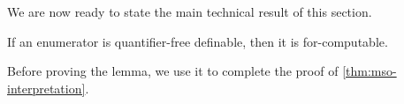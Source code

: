 



 
We are now ready to state  the main technical result of this section.
\begin{lemma}\label{lem:quantifier-free-tuple-enumerator-is-for-definable}
    If an  enumerator is quantifier-free definable, then it is for-computable.
\end{lemma}

    Before proving the lemma, we use it to complete the proof of \cref{thm:mso-interpretation}. 

